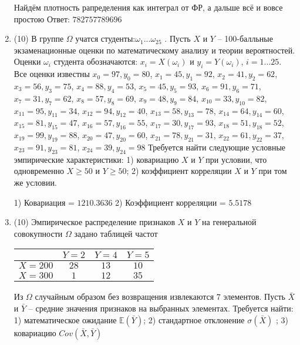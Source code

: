 \documentclass[a4paper,12pt]{article}
\begin{document}
\begin{enumerate}
Найдём плотность рапределения как интеграл от ФР, а дальше всё и вовсе простою Ответ: $782757789696$


\item


(10) В группе $\Omega$ учатся студенты:$\omega _{1}...\omega _{25}$ . Пусть $X$ и $Y$ – 100-балльные экзаменационные оценки по
математическому анализу и теории вероятностей. Оценки $\omega _{i}$ студента обозначаются: $x _{i} = X(\omega _{i})$ и $y _{i} = Y(\omega _{i})$, $i = 1...25$. Все оценки известны
$x _{0} = 97, y _{0} = 80$, $x _{1} = 45, y _{1} = 92$, $x _{2} = 41, y _{2} = 62$, $x _{3} = 56, y _{3} = 75$, $x _{4} = 88, y _{4} = 53$, $x _{5} = 45, y _{5} = 93$, $x _{6} = 91, y _{6} = 71$, $x _{7} = 31, y _{7} = 62$, $x _{8} = 57, y _{8} = 69$, $x _{9} = 48, y _{9} = 84$, $x _{10} = 33, y _{10} = 82$, $x _{11} = 95, y _{11} = 34$, $x _{12} = 94, y _{12} = 40$, $x _{13} = 58, y _{13} = 78$, $x _{14} = 64, y _{14} = 60$, $x _{15} = 81, y _{15} = 47$, $x _{16} = 57, y _{16} = 55$, $x _{17} = 30, y _{17} = 93$, $x _{18} = 51, y _{18} = 52$, $x _{19} = 99, y _{19} = 88$, $x _{20} = 47, y _{20} = 60$, $x _{21} = 78, y _{21} = 31$, $x _{22} = 61, y _{22} = 37$, $x _{23} = 91, y _{23} = 81$, $x _{24} = 39, y _{24} = 98$
Требуется
найти следующие условные эмпирические характеристики: 1) ковариацию $X$ и $Y$ при условии, что одновременно $X \geqslant 50$
 и $Y \geqslant 50$; 2) коэффициент корреляции $X$ и $Y$ при том же условии.




1) Ковариация = $1210.3636$
2) Коэффициент корреляции = $5.5178$


\item


(10) Эмпирическое распределение признаков $X$ и $Y$ на генеральной совокупности $\Omega$ задано таблицей частот  
 
\begin{tabular}{ | c | c | c | c | }
\hline
 & $Y = 2$ & $Y = 4$ & $Y = 5$  \\ \hline
$X = 200$ & $28$ & $13$ & $10$\\ \hline
$X = 300$ & $1$ & $12$ & $35$\\
\hline
\end{tabular}

Из $\Omega$ случайным образом без возвращения извлекаются $7$ элементов. 
Пусть $\bar X$ и $\bar Y$ – средние значения признаков на выбранных элементах. 
Требуется найти: 1) математическое ожидание $\mathbb{E}(\bar Y)$; 2) стандартное отклонение $\sigma(\bar X)$ ; 
3) ковариацию $Cov(\bar X, \bar Y)$





\end{enumerate}
\end{document}
